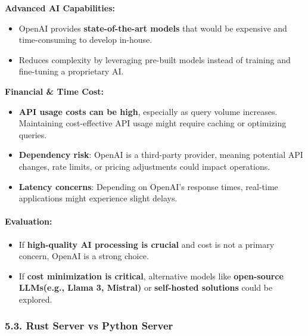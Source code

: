 \documentclass[
]{article}
\providecommand{\tightlist}{%
  \setlength{\itemsep}{0pt}\setlength{\parskip}{0pt}}
\begin{document}
\textbf{Advanced AI Capabilities:}

\begin{itemize}
\tightlist
\item
  OpenAI provides \textbf{state-of-the-art models} that would be
  expensive and time-consuming to develop in-house.
\item
  Reduces complexity by leveraging pre-built models instead of training
  and fine-tuning a proprietary AI.
\end{itemize}

\textbf{Financial \& Time Cost:}

\begin{itemize}
\tightlist
\item
  \textbf{API usage costs can be high}, especially as query volume
  increases. Maintaining cost-effective API usage might require caching
  or optimizing queries.
\item
  \textbf{Dependency risk}: OpenAI is a third-party provider, meaning
  potential API changes, rate limits, or pricing adjustments could
  impact operations.
\item
  \textbf{Latency concerns}: Depending on OpenAI's response times,
  real-time applications might experience slight delays.
\end{itemize}

\hypertarget{evaluation-1}{%
\paragraph{\texorpdfstring{\textbf{Evaluation:}}{Evaluation:}}\label{evaluation-1}}

\begin{itemize}
\tightlist
\item
  If \textbf{high-quality AI processing is crucial} and cost is not a
  primary concern, OpenAI is a strong choice.
\item
  If \textbf{cost minimization is critical}, alternative models like
  \textbf{open-source LLMs(e.g., Llama 3, Mistral)} or
  \textbf{self-hosted solutions} could be explored.
\end{itemize}

\hypertarget{rust-server-vs-python-server}{%
\subsubsection{\texorpdfstring{\textbf{5.3. Rust Server vs Python
Server}}{5.3. Rust Server vs Python Server}}\label{rust-server-vs-python-server}}
\end{document}
